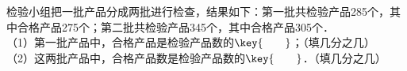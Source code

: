检验小组把一批产品分成两批进行检查，结果如下：第一批共检验产品285个，其中合格产品275个；第二批共检验产品345个，其中合格产品305个．\\
（1）第一批产品中，合格产品是检验产品数的$\key{\qquad}$；（填几分之几）\\
（2）这两批产品中，合格产品数是检验产品数的$\key{\qquad}$．（填几分之几）